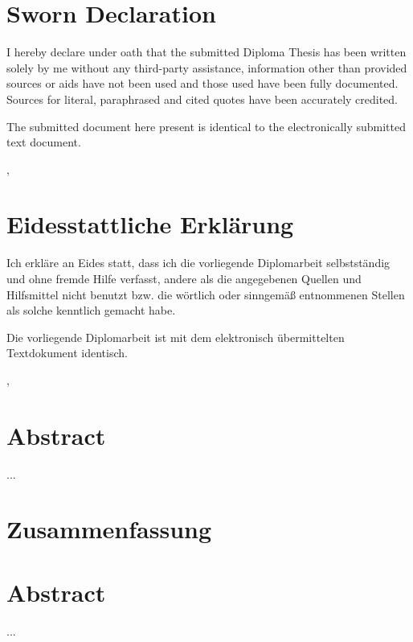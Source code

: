 
	\ifeng \chapter*{Sworn Declaration}
	I hereby declare under oath that the submitted Diploma Thesis has been written solely by me without any third-party assistance, information other than provided sources or aids have not been used and those used have been fully documented. Sources for literal, paraphrased and cited quotes have been accurately credited.

	The submitted document here present is identical to the electronically submitted text document.

	\vskip1cm
	\place, \date

	\else \chapter*{Eidesstattliche Erklärung}
	Ich erkläre an Eides statt, dass ich die vorliegende Diplomarbeit selbstständig und ohne fremde Hilfe verfasst, andere als die angegebenen Quellen und Hilfsmittel nicht benutzt bzw. die wörtlich oder sinngemäß entnommenen Stellen als solche kenntlich gemacht habe.

	Die vorliegende Diplomarbeit ist mit dem elektronisch übermittelten Textdokument identisch.

	\vskip1cm
	\place, \date
	\fi

	\ifeng	\chapter*{Abstract}
	\fi

...

	{\let\clearpage\relax
	\ifeng	{} \chapter*{Zusammenfassung}
	\else	{} \chapter*{Abstract}
	\fi

...

	\ifeng	{}
	\else 	{}
	\fi}

